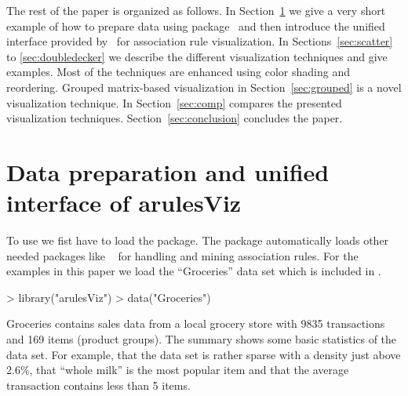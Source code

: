 \documentclass[nojss]{jss}
\begin{document}
The rest of the paper is organized as follows.
In Section~\ref{sec:prep} we give a very short example
of how to prepare data using package~ and then introduce
the unified interface provided by~ for association
rule visualization.
In Sections~\ref{sec:scatter} to \ref{sec:doubledecker} we describe
the different visualization techniques and give examples.
Most of the techniques are enhanced using color shading and reordering.
Grouped matrix-based visualization in Section~\ref{sec:grouped} is
a novel visualization technique.
In Section~\ref{sec:comp} compares the presented visualization techniques.
Section~\ref{sec:conclusion} concludes the paper.


\section{Data preparation and unified interface of arulesViz}
\label{sec:prep}

To use  we fist have to load the package.
The package automatically loads other needed packages like
~\citep{arulesViz:Hahsler:2010}
for handling and mining association rules.
For the examples in this paper we load
the ``Groceries'' data set which is included in .

\begin{Schunk}
\begin{Sinput}
> library("arulesViz")
> data("Groceries")
\end{Sinput}
\end{Schunk}

Groceries contains sales data from a local grocery store with 9835 transactions
and 169 items (product groups). The summary shows some basic statistics of
the data set. For example, that the data set is rather sparse
with a density just above 2.6\%, that
``whole milk'' is the most popular item and that the average transaction
contains less than 5 items.
\end{document}
